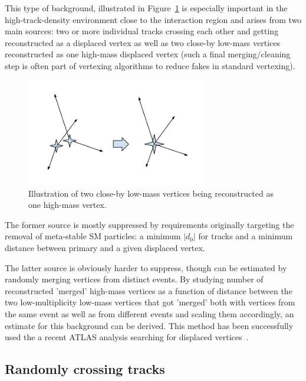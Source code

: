 This type of background, illustrated in Figure~\ref{fig:mergedvertices} is especially important in the high-track-density environment close to the interaction region and arises from two main sources: two or more individual tracks crossing each other and getting reconstructed as a displaced vertex as well as two close-by low-mass vertices reconstructed as one high-mass displaced vertex (such a final merging/cleaning step is often part of vertexing algorithms to reduce fakes in standard vertexing).

\begin{figure}[h]
  \centering
  \includegraphics[width=0.7\textwidth]{figures/mergedvertices.png}
  \caption{Illustration of two close-by low-mass vertices being reconstructed as one high-mass vertex.}
  \label{fig:mergedvertices}
\end{figure}

The former source is mostly suppressed by requirements originally targeting the removal of meta-stable SM particles: a minimum $|d_0|$ for tracks and a minimum distance between primary and a given displaced vertex.

The latter source is obviously harder to suppress, though can be estimated by randomly merging vertices from distinct events. By studying number of reconstructed 'merged' high-mass vertices as a function of distance between the two low-multiplicity low-mass vertices that got 'merged' both with vertices from the same event as well as from different events and scaling them accordingly, an estimate for this background can be derived. This method has been successfully used the a recent ATLAS analysis searching for displaced vertices~\cite{Aaboud:2017iio}.

\subsection{Randomly crossing tracks} %

